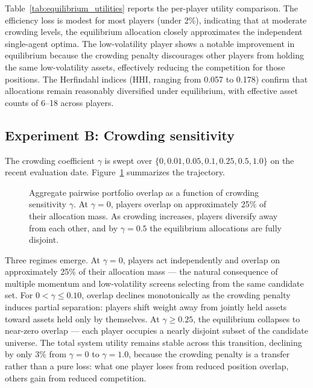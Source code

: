 \documentclass[journal,10pt]{IEEEtran}
\begin{document}
Table~\ref{tab:equilibrium_utilities} reports the per-player utility comparison. The efficiency loss is modest for most players (under 2\%), indicating that at moderate crowding levels, the equilibrium allocation closely approximates the independent single-agent optima. The low-volatility player shows a notable improvement in equilibrium because the crowding penalty discourages other players from holding the same low-volatility assets, effectively reducing the competition for those positions. The Herfindahl indices (HHI, ranging from 0.057 to 0.178) confirm that allocations remain reasonably diversified under equilibrium, with effective asset counts of 6--18 across players.

\subsection{Experiment B: Crowding sensitivity}
The crowding coefficient $\gamma$ is swept over $\{0,0.01,0.05,0.1,0.25,0.5,1.0\}$ on the recent evaluation date. Figure~\ref{fig:crowding_sweep} summarizes the trajectory.

\begin{figure}[!t]
\centering
{}
\caption{Aggregate pairwise portfolio overlap as a function of crowding sensitivity $\gamma$. At $\gamma=0$, players overlap on approximately 25\% of their allocation mass. As crowding increases, players diversify away from each other, and by $\gamma=0.5$ the equilibrium allocations are fully disjoint.}
\label{fig:crowding_sweep}
\end{figure}

Three regimes emerge. At $\gamma=0$, players act independently and overlap on approximately 25\% of their allocation mass — the natural consequence of multiple momentum and low-volatility screens selecting from the same candidate set. For $0<\gamma\le0.10$, overlap declines monotonically as the crowding penalty induces partial separation: players shift weight away from jointly held assets toward assets held only by themselves. At $\gamma\ge0.25$, the equilibrium collapses to near-zero overlap — each player occupies a nearly disjoint subset of the candidate universe. The total system utility remains stable across this transition, declining by only 3\% from $\gamma=0$ to $\gamma=1.0$, because the crowding penalty is a transfer rather than a pure loss: what one player loses from reduced position overlap, others gain from reduced competition.
\end{document}
